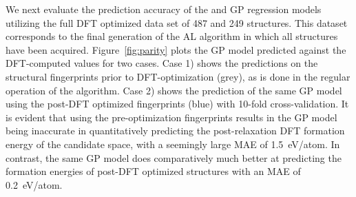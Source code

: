 We next evaluate the prediction accuracy of the \IrOtwo and \IrOthree GP regression models utilizing the full DFT optimized data set of 487 \IrOtwo and 249 \IrOthree structures.
%
This dataset corresponds to the final generation of the AL algorithm in which all structures have been acquired.
%
Figure~\ref{fig:parity} plots the GP model predicted \DHf against the DFT-computed values for two cases.
%
Case 1) shows the predictions on the structural fingerprints prior to DFT-optimization (grey), as is done in the regular operation of the algorithm.
%
Case 2) shows the prediction of the same GP model using the post-DFT optimized fingerprints (blue) with \num{10}-fold cross-validation.
%
It is evident that using the pre-optimization fingerprints results in the GP model being inaccurate in quantitatively predicting the post-relaxation DFT formation energy of the candidate space,
with a seemingly large MAE of \mytilde\SI{1.5}{\electronvolt}/atom.
%
In contrast, the same GP model does comparatively much better at predicting the formation energies of post-DFT optimized structures with an MAE of \mytilde\SI{0.2}{\electronvolt}/atom.


